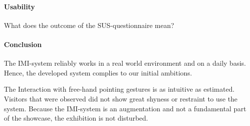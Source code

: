 
\paragraph{Usability}

What does the outcome of the \ac{SUS}-questionnaire mean?


\paragraph{Conclusion}

The \ac{IMI}-system reliably works in a real world environment and on a daily basis. Hence, the developed system complies to our initial ambitions.

The Interaction with free-hand pointing gestures is as intuitive as estimated. Visitors that were observed did not show great shyness or restraint to use the system. Because the \ac{IMI}-system is an augmentation and not a fundamental part of the showcase, the exhibition is not disturbed. 


%
